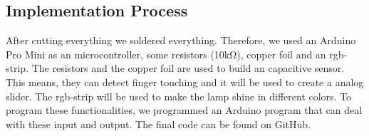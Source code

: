 \documentclass[doc.tex]{subfiles}
\begin{document}
        \noindent

    \subsection{Implementation Process}
        \begin{flushleft}
            After cutting everything we soldered everything. Therefore, we used an Arduino Pro Mini \cite{arduinoProMini} 
            as an microcontroller, some resistors (10k\si{\ohm}), copper foil and an rgb-strip. \newline
            The resistors and the copper foil are used to build an capacitive sensor. \cite{Badger2019} 
            This means, they can detect finger touching and it will be used to create a analog slider.
            The rgb-strip will be used to make the lamp shine in different colors. \cite{Burgess2019} 
            \newline 
            \noindent
            To program these functionalities, we programmed an Arduino program that can deal with these input 
            and output. The final code can be found on GitHub. %
        \end{flushleft}
\end{document}
